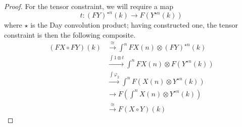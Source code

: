 \documentclass{amsbook} %
\numberwithin{section}{chapter}
\begin{document}
\begin{proof}
For the tensor constraint, we will require a map
  \[
    t \colon (FY)^{\star n}(k) \rightarrow F\left(Y^{\star n}(k)\right)
  \]
 where $\star$ is the Day convolution product; having constructed one, the tensor constraint is then the following composite.
  \begin{align*}
    (FX \circ FY)(k)  &\xrightarrow{\cong} \int^{n} FX(n) \otimes (FY)^{\star n}(k) \\
    &\xrightarrow{\int 1 \otimes t} \int^{n} FX(n) \otimes F(Y^{\star n}(k)) \\
    &\xrightarrow{\int \varphi_2} \int^{n} F(X(n) \otimes Y^{\star n}(k)) \\
    &\longrightarrow F \left(\int^{n} X(n) \otimes Y^{\star n}(k)\right) \\
    &\xrightarrow{\cong} F(X \circ Y)(k)
  \end{align*}


\end{proof}
\end{document}
